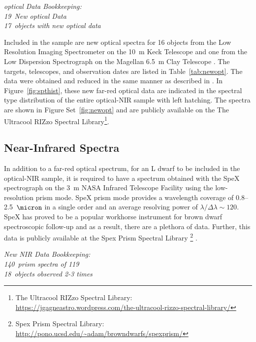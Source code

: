 \documentclass[12pt,preprint]{aastex}
\newcommand{\NewOptSpectra}{19} %
\newcommand{\NewOptObjects}{17} %
\newcommand{\NewPrismSpectra}{140} %
\newcommand{\dupes}{18} %
\newcommand{\NewPrismObjects}{119} %
\begin{document}
\label{sec:obs_new_opt}

\emph{optical Data Bookkeeping: \\
\NewOptSpectra~New optical Data\\
\NewOptObjects~objects with new optical data\\}

Included in the sample are new optical spectra for 16 objects from the Low Resolution Imaging Spectrometer on the 10~m Keck Telescope \citep[LRIS]{LRIS} and one from the Low Dispersion Spectrograph on the Magellan 6.5~m Clay Telescope \citep[LDSS-3]{LDSS2}.
The targets, telescopes, and observation dates are listed in Table~\ref{tab:newopt}.
The data were obtained and reduced in the same manner as described in \citet{Kirkpatrick10}.
In Figure~\ref{fig:spthist}, these new far-red optical data are indicated in the spectral type distribution of the entire optical-NIR sample with left hatching.
The spectra are shown in Figure Set~\ref{fig:newopt} and are publicly available on the The Ultracool RIZzo Spectral Library\footnote{The Ultracool RIZzo Spectral Library: \url{https://jgagneastro.wordpress.com/the-ultracool-rizzo-spectral-library/}}.

\subsection{Near-Infrared Spectra}

In addition to a far-red optical spectrum, for an L dwarf to be included in the optical-NIR sample, it is required to have a spectrum obtained with the SpeX spectrograph \citep{Spex} on the 3~m NASA Infrared Telescope Facility using the low-resolution prism mode.
SpeX prism mode provides a wavelength coverage of 0.8--2.5~$\micron$ in a single order and an average resolving power of $\lambda/\Delta\lambda\sim120$.
SpeX has proved to be a popular workhorse instrument for brown dwarf spectroscopic follow-up and as a result, there are a plethora of data.
Further, this data is publicly available at the Spex Prism Spectral Library \footnote{Spex Prism Spectral Library: \url{http://pono.ucsd.edu/~adam/browndwarfs/spexprism/}} \citep{Burgasser:2014tr}.

\label{sec:obs_new_nir}

\emph{New NIR Data Bookkeeping: \\
\NewPrismSpectra~prism spectra of \NewPrismObjects \\
\dupes~objects observed 2-3 times}
\end{document}
